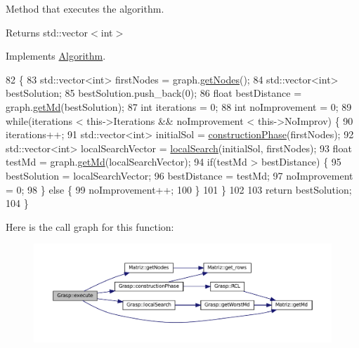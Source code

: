 Method that executes the algorithm. 

\begin{DoxyReturn}{Returns}
std\+::vector$<$int$>$ 
\end{DoxyReturn}


Implements \hyperlink{classAlgorithm_af6ea9eb9a6dbd41896e3fd7dabac096b}{Algorithm}.


\begin{DoxyCode}
82                               \{
83   std::vector<int> firstNodes = graph.\hyperlink{classMatriz_a394b84a5ec13fd2f4d202ab218680afe}{getNodes}();
84   std::vector<int> bestSolution;
85   bestSolution.push\_back(0);
86   \textcolor{keywordtype}{float} bestDistance = graph.\hyperlink{classMatriz_a8df14a27d791f24206dd633b2a685c5b}{getMd}(bestSolution);
87   \textcolor{keywordtype}{int} iterations = 0;
88   \textcolor{keywordtype}{int} noImprovement = 0;
89   \textcolor{keywordflow}{while}(iterations < this->Iterations && noImprovement < this->NoImprov) \{
90     iterations++;
91     std::vector<int> initialSol = \hyperlink{classGrasp_aef091e71dd747ebcb78e1ebcdcf44221}{constructionPhase}(firstNodes);
92     std::vector<int> localSearchVector = \hyperlink{classGrasp_a7c5bebb4a0dea342928f66fb73a56559}{localSearch}(initialSol, firstNodes);
93     \textcolor{keywordtype}{float} testMd = graph.\hyperlink{classMatriz_a8df14a27d791f24206dd633b2a685c5b}{getMd}(localSearchVector);
94     \textcolor{keywordflow}{if}(testMd > bestDistance) \{
95       bestSolution = localSearchVector;
96       bestDistance = testMd;
97       noImprovement = 0;
98     \} \textcolor{keywordflow}{else} \{
99       noImprovement++;
100     \}
101   \}
102   
103 \textcolor{keywordflow}{return} bestSolution;
104 \}
\end{DoxyCode}
Here is the call graph for this function\+:
\nopagebreak
\begin{figure}[H]
\begin{center}
\leavevmode
\includegraphics[width=350pt]{classGrasp_a335b063bccd26b434dda3a3a69d6d711_cgraph}
\end{center}
\end{figure}
